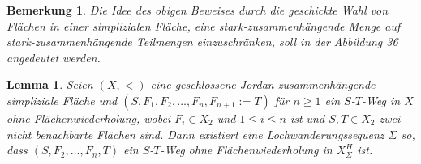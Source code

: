 \documentclass[12pt,titlepage,twoside,cleardoublepage]{article}
\theoremstyle{nummermitklammern}
\newtheorem{lemma}[temp]{Lemma}
\newtheorem{bemerkung}[temp]{Bemerkung}
\newtheorem{lemma}[zahl]{Lemma}
\newtheorem{bemerkung}[zahl]{Bemerkung}
\numberwithin{equation}{section}
\begin{document}
\begin{bemerkung}
Die Idee des obigen Beweises durch die geschickte Wahl von Flächen in einer simplizialen Fläche, eine stark-zusammenhängende Menge auf stark-zusammenhängende Teilmengen einzuschränken, soll in der Abbildung 36 angedeutet werden.
\end{bemerkung}
\begin{lemma} \label{lemma2} 
Seien $(X,<)$ eine geschlossene Jordan-zusammenhängende simpliziale Fläche und $(S,F_1,F_2,\ldots,F_n,F_{n+1}:=T)$ für $n\geq 1$ ein $S$-$T$-Weg in $X$ ohne Flächenwiederholung, wobei $F_i \in X_2$ und $1 \leq i \leq n$ ist und $S,T\in X_2$ zwei nicht benachbarte Flächen sind. 
Dann existiert eine Lochwanderungssequenz $\Sigma$ so, dass $(S,F_2, \ldots,F_n,T)$ ein $S$-$T$-Weg ohne Flächenwiederholung in $X^H_{\Sigma}$ ist.
\end{lemma}
\end{document}

